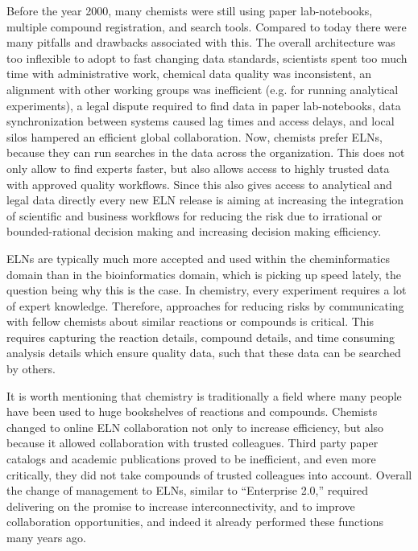 \documentclass{sig-alternate}
\begin{document}
Before the year 2000, many chemists were still using paper
lab-notebooks, multiple compound registration, and search tools. Compared to
today there were many pitfalls and drawbacks associated with this. The overall architecture
was too inflexible to adopt to fast changing data standards, scientists spent
too much time with administrative work, chemical data quality was inconsistent,
an alignment with other working groups was inefficient (e.g. for running
analytical experiments), a legal dispute required to find data in paper
lab-notebooks, data synchronization between systems caused lag times and access
delays, and local silos hampered an efficient global collaboration. Now,
chemists prefer ELNs, because they can run searches in the data across the organization. This does
not only allow to find experts faster, but also allows access to highly trusted
data with approved quality workflows. Since this also gives access to
analytical and legal data directly every new ELN release is aiming at increasing
the integration of scientific and business workflows for reducing the risk due
to irrational or bounded-rational decision making and increasing decision making
efficiency.

ELNs are typically much more accepted and used within the cheminformatics
domain than in the bioinformatics domain, which is picking up speed lately, the
question being why this is the case. In chemistry, every experiment requires a lot of expert
knowledge. Therefore, approaches for reducing risks by communicating
with fellow chemists about similar reactions or compounds is critical. This
requires capturing the reaction details, compound details, and time consuming
analysis details which ensure quality data, such that these data can be searched by others.

It is worth mentioning that chemistry is traditionally a field where many people
have been used to huge bookshelves of reactions and compounds. Chemists changed
to online ELN collaboration not only to increase efficiency, but also
because it allowed collaboration with trusted colleagues. Third party paper
catalogs and academic publications proved to be
inefficient, and even more critically, they did not take compounds of trusted
colleagues into account. Overall the change of management to ELNs, similar to
``Enterprise 2.0,'' required delivering on the promise to increase
interconnectivity, and to improve collaboration
opportunities, and indeed it already performed these functions many years ago.
\end{document}
